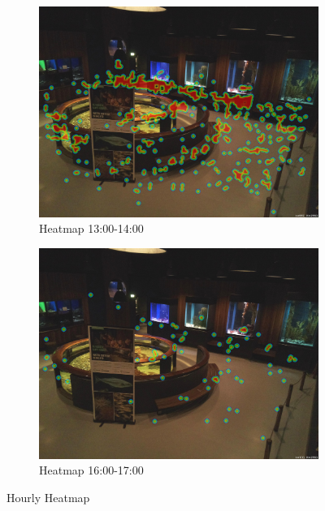 \begin{figure}[H]
    \centering
    \begin{subfigure}{0.475\textwidth}
        \centering
        \includegraphics[width=\textwidth]{Images/Analytics/heatmap_time_1300_1400.jpg}
        \caption{Heatmap 13:00-14:00}
    \end{subfigure}
    \hfill
    \begin{subfigure}{0.475\textwidth}
        \centering
        \includegraphics[width=1\textwidth]{Images/Analytics/heatmap_time_1600_1700.jpg}
        \caption{Heatmap 16:00-17:00}
    \end{subfigure}
    \caption{Hourly Heatmap}
    \label{fig:heatmap_time}
\end{figure}

